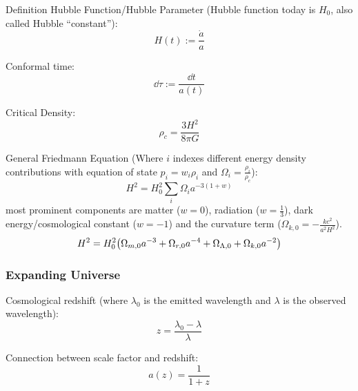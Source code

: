 			\noindent
			Definition Hubble Function/Hubble Parameter{} (Hubble function today is $H_0$, also called Hubble ``constant''):
			\begin{equation}
				H(t) := \frac{\dot{a}}{a}
			\end{equation}

			\noindent
			Conformal time:
			\begin{equation}
				\dd \tau := \frac{\dd t}{a(t)}
			\end{equation}

			\noindent
			Critical Density:
			\begin{equation}
				\rho_{c} = \frac{3 H^2}{8 \pi G}
			\end{equation}

			\noindent
			General Friedmann Equation (Where $i$ indexes different energy density contributions with equation of state $p_i = w_i \rho_i$ and $\Omega_i = \frac{\rho_i}{\rho_c}$):
			\begin{equation}
				H^2 = H_0^2\sum_i \Omega_i a^{-3(1+w)}
			\end{equation}
			most prominent components are matter ($w=0$), radiation ($w=\frac{1}{3}$), dark energy/cosmological constant ($w=-1$) and the curvature term ($\Omega_{k,0}=-\frac{k c^2}{a^2 H^2}$).
			\begin{equation}
				H^2 = H_0^2 \qty(\Omega_{m,0} a^{-3} + \Omega_{r,0} a^{-4} + \Omega_{\Lambda,0} + \Omega_{k,0} a^{-2})				
			\end{equation}


		\subsubsection{Expanding Universe}
			Cosmological redshift (where $\lambda_0$ is the emitted wavelength and $\lambda$ is the observed wavelength):
			\begin{equation}
				z = \frac{\lambda_0 - \lambda}{\lambda}
			\end{equation}

			\noindent
			Connection between scale factor and redshift:
			\begin{equation}
				a(z) = \frac{1}{1+z}
			\end{equation}